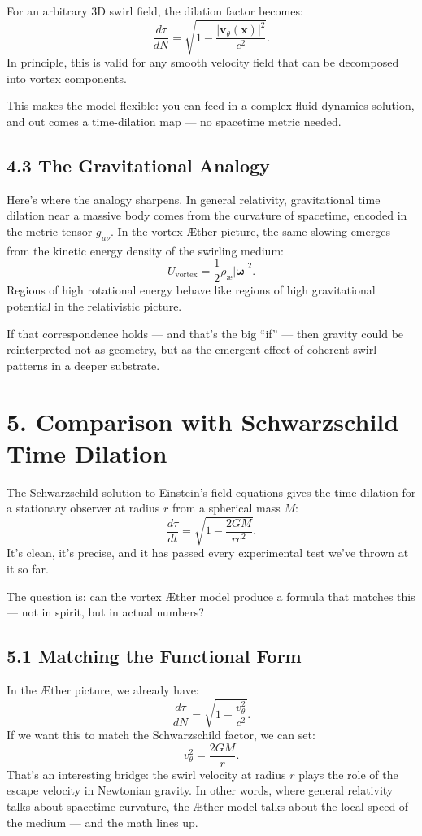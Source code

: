 \documentclass[11pt]{article}
\begin{document}
For an arbitrary 3D swirl field, the dilation factor becomes:
\[
\frac{d\tau}{dN} = \sqrt{1 - \frac{|\mathbf{v}_\theta(\mathbf{x})|^2}{c^2}}.
\]
In principle, this is valid for any smooth velocity field that can be decomposed into vortex components.

This makes the model flexible: you can feed in a complex fluid-dynamics solution, and out comes a time-dilation map — no spacetime metric needed.

\subsection*{4.3 The Gravitational Analogy}

Here’s where the analogy sharpens. In general relativity, gravitational time dilation near a massive body comes from the curvature of spacetime, encoded in the metric tensor $g_{\mu\nu}$. In the vortex Æther picture, the same slowing emerges from the kinetic energy density of the swirling medium:
\[
U_\text{vortex} = \frac{1}{2} \rho_{\text{\ae}} |\boldsymbol{\omega}|^2.
\]
Regions of high rotational energy behave like regions of high gravitational potential in the relativistic picture.

If that correspondence holds — and that’s the big “if” — then gravity could be reinterpreted not as geometry, but as the emergent effect of coherent swirl patterns in a deeper substrate.

\section*{5. Comparison with Schwarzschild Time Dilation}

The Schwarzschild solution to Einstein’s field equations gives the time dilation for a stationary observer at radius $r$ from a spherical mass $M$:
\[
\frac{d\tau}{dt} = \sqrt{1 - \frac{2GM}{rc^2}}.
\]
It’s clean, it’s precise, and it has passed every experimental test we’ve thrown at it so far.

The question is: can the vortex Æther model produce a formula that matches this — not in spirit, but in actual numbers?

\subsection*{5.1 Matching the Functional Form}

In the Æther picture, we already have:
\[
\frac{d\tau}{dN} = \sqrt{1 - \frac{v_\theta^2}{c^2}}.
\]
If we want this to match the Schwarzschild factor, we can set:
\[
v_\theta^2 = \frac{2GM}{r}.
\]
That’s an interesting bridge: the swirl velocity at radius $r$ plays the role of the escape velocity in Newtonian gravity. In other words, where general relativity talks about spacetime curvature, the Æther model talks about the local speed of the medium — and the math lines up.
\end{document}
